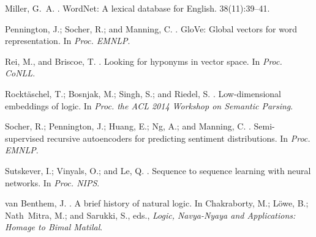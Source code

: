 \documentclass[letterpaper]{article}
\begin{document}
\begin{thebibliography}{}
Miller, G.~A.
.
\newblock Word{N}et: A lexical database for {E}nglish.
 38(11):39--41.

Pennington, J.; Socher, R.; and Manning, C.
.
\newblock Glo{V}e: {G}lobal vectors for word representation.
\newblock In {\em Proc. EMNLP}.

Rei, M., and Briscoe, T.
.
\newblock Looking for hyponyms in vector space.
\newblock In {\em Proc. {CoNLL}}.

Rockt{\"a}schel, T.; Bosnjak, M.; Singh, S.; and Riedel, S.
.
\newblock Low-dimensional embeddings of logic.
\newblock In {\em Proc. the ACL 2014 Workshop on Semantic Parsing}.

Socher, R.; Pennington, J.; Huang, E.; Ng, A.; and Manning, C.
.
\newblock Semi-supervised recursive autoencoders for predicting sentiment
  distributions.
\newblock In {\em Proc. EMNLP}.

Sutskever, I.; Vinyals, O.; and Le, Q.
.
\newblock Sequence to sequence learning with neural networks.
\newblock In {\em Proc. {NIPS}}.

van Benthem, J.
.
\newblock A brief history of natural logic.
\newblock In Chakraborty, M.; L{\"o}we, B.; Nath~Mitra, M.; and Sarukki, S.,
  eds., {\em Logic, Navya-Nyaya and Applications: Homage to {B}imal {M}atilal}.

\end{thebibliography}
 
\end{document}
